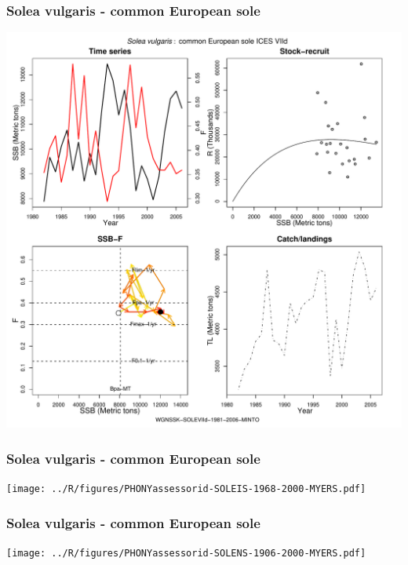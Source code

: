 \subsubsection{Solea vulgaris - common European sole}
\begin{center}
\includegraphics[width=1.2\textwidth]{../R/figures/WGNSSK-SOLEVIId-1981-2006-MINTO.pdf}
\end{center}

\subsubsection{Solea vulgaris - common European sole}
\begin{center}
\texttt{[image: ../R/figures/PHONYassessorid-SOLEIS-1968-2000-MYERS.pdf]}
\end{center}

\subsubsection{Solea vulgaris - common European sole}
\begin{center}
\texttt{[image: ../R/figures/PHONYassessorid-SOLENS-1906-2000-MYERS.pdf]}
\end{center}

